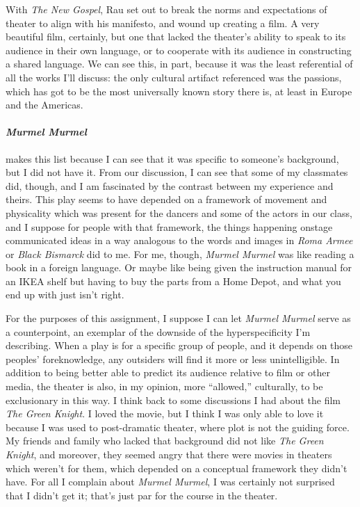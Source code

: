 With \textit{The New Gospel}, Rau set out to break the norms and expectations of theater
to align with his manifesto, and wound up creating a film. A very beautiful film,
certainly, but one that lacked the theater's ability to speak to its audience in their own
language, or to cooperate with its audience in constructing a shared language. We can see
this, in part, because it was the least referential of all the works I'll discuss: the
only cultural artifact referenced was the passions, which has got to be the most
universally known story there is, at least in Europe and the Americas.

\clearpage{}

\paragraph{\textit{Murmel Murmel}} makes this list because I can see that it was specific
to someone's background, but I did not have it. From our discussion, I can see that some
of my classmates did, though, and I am fascinated by the contrast between my experience
and theirs. This play seems to have depended on a framework of movement and physicality
which was present for the dancers and some of the actors in our class, and I suppose for
people with that framework, the things happening onstage communicated ideas in a way
analogous to the words and images in \textit{Roma Armee} or \textit{Black Bismarck} did to
me. For me, though, \textit{Murmel Murmel} was like reading a book in a foreign
language. Or maybe like being given the instruction manual for an IKEA shelf but having to
buy the parts from a Home Depot, and what you end up with just isn't right.

For the purposes of this assignment, I suppose I can let \textit{Murmel Murmel} serve as a
counterpoint, an exemplar of the downside of the hyperspecificity I'm describing. When a
play is for a specific group of people, and it depends on those peoples' foreknowledge,
any outsiders will find it more or less unintelligible. In addition to being better able
to predict its audience relative to film or other media, the theater is also, in my
opinion, more \enquote{allowed,} culturally, to be exclusionary in this way.  I think back
to some discussions I had about the film \textit{The Green Knight}. I loved the movie, but
I think I was only able to love it because I was used to post-dramatic theater, where plot
is not the guiding force. My friends and family who lacked that background did not like
\textit{The Green Knight}, and moreover, they seemed angry that there were movies in
theaters which weren't for them, which depended on a conceptual framework they didn't
have. For all I complain about \textit{Murmel Murmel}, I was certainly not surprised that
I didn't get it; that's just par for the course in the theater.

